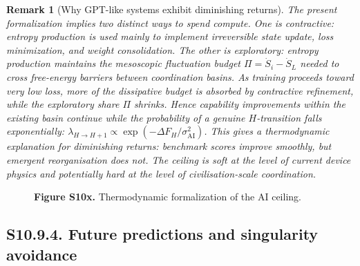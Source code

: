 \documentclass[11pt]{article}
\newtheorem{remark}{Remark}
\begin{document}
\begin{remark}[Why GPT-like systems exhibit diminishing returns]
\label{rmk:gpt_diminishing_returns}
The present formalization implies two distinct ways to spend compute.
One is \emph{contractive}: entropy production is used mainly to implement
irreversible state update, loss minimization, and weight consolidation.
The other is \emph{exploratory}: entropy production maintains the mesoscopic
fluctuation budget $\Pi=\dot S_i-\dot S_L$ needed to cross free-energy
barriers between coordination basins.
As training proceeds toward very low loss, more of the dissipative budget is
absorbed by contractive refinement, while the exploratory share $\Pi$ shrinks.
Hence capability improvements within the existing basin continue while the
probability of a genuine $H$-transition falls exponentially:
$\lambda_{H\to H+1}\propto\exp(-\Delta F_H/\sigma_{\mathrm{AI}}^2)$.
This gives a thermodynamic explanation for diminishing returns:
benchmark scores improve smoothly, but emergent reorganisation does not.
The ceiling is \emph{soft} at the level of current device physics and
\emph{potentially hard} at the level of civilisation-scale coordination.
\end{remark}

\begin{figure}[H]
\captionsetup{labelformat=empty}
\centering
{}
\caption{\textbf{Figure S10x.} Thermodynamic formalization of the AI ceiling.}
\label{fig:S10x_omega_complexity}
\end{figure}

\subsection*{S10.9.4. Future predictions and singularity avoidance}
\label{sec:S10_9_4_future}
\end{document}

